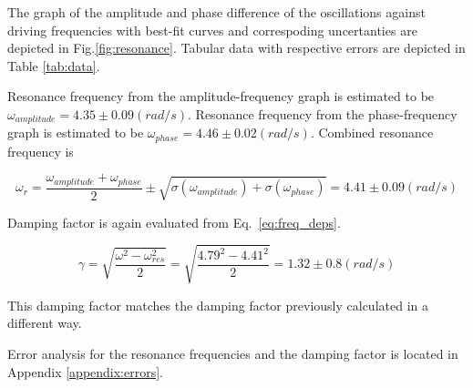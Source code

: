 The graph of the amplitude and phase difference of the oscillations against driving frequencies with best-fit curves and correspoding uncertanties are depicted in Fig.\ref{fig:resonance}. Tabular data with respective errors are depicted in Table \ref{tab:data}.

Resonance frequency from the amplitude-frequency graph is estimated to be $\omega_{amplitude} = 4.35 \pm 0.09 (rad/s)$. Resonance frequency from the phase-frequency graph is estimated to be $\omega_{phase} = 4.46 \pm 0.02 (rad/s)$. Combined resonance frequency is

\begin{equation*}
\omega_{r} = \frac{\omega_{amplitude} + \omega_{phase}}{2} \pm \sqrt{\sigma(\omega_{amplitude}) + \sigma(\omega_{phase})} = 4.41 \pm 0.09 (rad/s)
\end{equation*}

Damping factor is again evaluated from Eq.~\ref{eq:freq_deps}.

\begin{equation*}
        \gamma = \sqrt{ \frac{\omega^2 - \omega_{res}^2}{2} } = \sqrt{ \frac{4.79^2 - 4.41^2}{2} } = 1.32 \pm 0.8 (rad/s)
\end{equation*}       

This damping factor matches the damping factor previously calculated in a different way.

Error analysis for the resonance frequencies and the damping factor is located in Appendix \ref{appendix:errors}.
